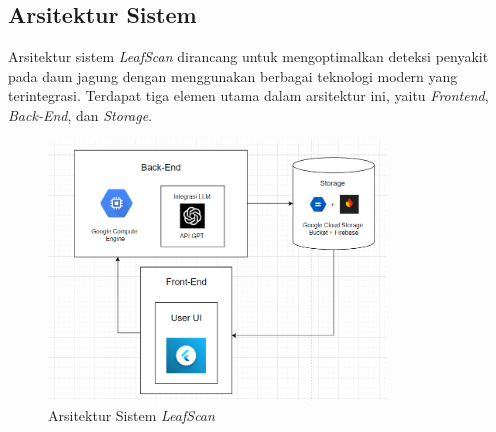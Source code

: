 \documentclass[journal,article,submit,pdftex,moreauthors]{Definitions/mdpi}
\begin{document}
\subsection{Arsitektur Sistem}

Arsitektur sistem \textit{LeafScan} dirancang untuk mengoptimalkan deteksi penyakit pada daun jagung dengan menggunakan berbagai teknologi modern yang terintegrasi. Terdapat tiga elemen utama dalam arsitektur ini, yaitu \textit{Frontend}, \textit{Back-End}, dan \textit{Storage}.

\begin{figure}[H]
    \centering
    \includegraphics[width=0.8\textwidth]{Images/architecture_system.png}
    \caption{\centering Arsitektur Sistem \textit{LeafScan}}
    \label{fig:arsitektur-sistem}
\end{figure}
\end{document}

